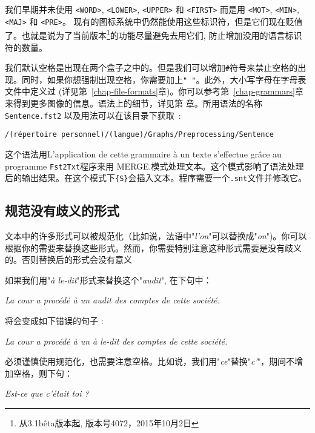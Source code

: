 \noindent  我们早期并未使用 \verb+<WORD>+, \verb+<LOWER>+, \verb+<UPPER>+ 和 \verb+<FIRST>+ 而是用 \verb+<MOT>+, \verb+<MIN>+, \verb+<MAJ>+ 和 \verb+<PRE>+。
 现有的图标系统中仍然能使用这些标识符，但是它们现在贬值了。也就是说为了当前版本\footnote{从3.1bêta版本起, 版本号4072，2015年10月2日}的功能尽量避免去用它们,
防止增加没用的语言标识符的数量。

\bigskip
\noindent 我们默认空格是出现在两个盒子之中的。但是我们可以增加\verb+#+符号来禁止空格的出现。同时，如果你想强制出现空格，你需要加上\verb+" "+。此外，大小写字母在字母表文件中定义过 
(详见第~\ref{chap-file-formats}章)。你可以参考第~\ref{chap-grammars}章来得到更多图像的信息。语法上的细节，详见第 \cite{ameliorer-decoupage-en-phrases}章。所用语法的名称 \verb+Sentence.fst2+ 以及用法可以在该目录下获取~:

\bigskip
\verb+/(répertoire personnel)/(langue)/Graphs/Preprocessing/Sentence+

\bigskip
\noindent 这个语法用L’application de cette grammaire à un texte s’effectue grâce au programme \verb+Fst2Txt+程序来用 MERGE.模式处理文本。这个模式影响了语法处理后的输出结果。在这个模式下\verb+{S}+会插入文本。程序需要一个\verb+.snt+文件并修改它。


\subsection{规范没有歧义的形式}

文本中的许多形式可以被规范化（比如说，法语中"\textit{l'on}"可以替换成"\textit{on}")。你可以根据你的需要来替换这些形式。然而，你需要特别注意这种形式需要是没有歧义的。否则替换后的形式会没有意义


\bigskip
\noindent 如果我们用"\textit{à le-dit}"形式来替换这个"\textit{audit}",
在下句中：

\bigskip
\textit{La cour a procédé à un audit des comptes de cette société.}

\bigskip
\noindent 将会变成如下错误的句子 :

\bigskip
\textit{La cour a procédé à un à le-dit des comptes de cette société.}

\bigskip
\noindent 必须谨慎使用规范化，也需要注意空格。比如说，我们用"\textit{ce}"替换"\textit{c’}"，期间不增加空格，则下句：

\bigskip
\textit{Est-ce que c’était toi ?}

